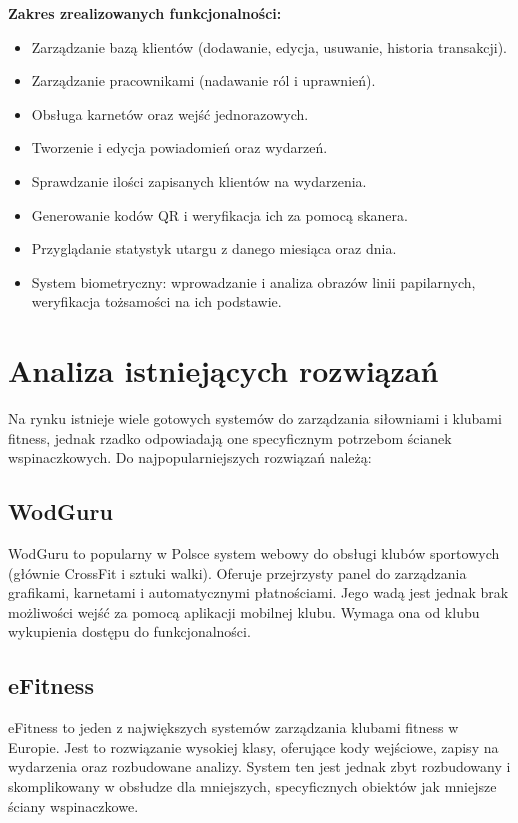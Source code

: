 \textbf{Zakres zrealizowanych funkcjonalności:}
\begin{itemize}
    \item Zarządzanie bazą klientów (dodawanie, edycja, usuwanie, historia transakcji).
    \item Zarządzanie pracownikami (nadawanie ról i uprawnień).
    \item Obsługa karnetów oraz wejść jednorazowych.
    \item Tworzenie i edycja powiadomień oraz wydarzeń.
    \item Sprawdzanie ilości zapisanych klientów na wydarzenia.
    \item Generowanie kodów QR i weryfikacja ich za pomocą skanera.
    \item Przyglądanie statystyk utargu z danego miesiąca oraz dnia.
    \item System biometryczny: wprowadzanie i analiza obrazów linii papilarnych, weryfikacja tożsamości na ich podstawie.
\end{itemize}

\section{Analiza istniejących rozwiązań}
\label{sec:istniejaceRozwiazania}

Na rynku istnieje wiele gotowych systemów do zarządzania siłowniami i klubami fitness, jednak rzadko odpowiadają one specyficznym potrzebom ścianek wspinaczkowych. Do najpopularniejszych rozwiązań należą:

\subsection{WodGuru}\cite{WodGuru}
WodGuru to popularny w Polsce system webowy do obsługi klubów sportowych (głównie CrossFit i sztuki walki). Oferuje przejrzysty panel do zarządzania grafikami, karnetami i automatycznymi płatnościami. Jego wadą jest jednak brak możliwości wejść za pomocą aplikacji mobilnej klubu. Wymaga ona od klubu wykupienia dostępu do funkcjonalności.

\subsection{eFitness}\cite{eFitness}
eFitness to jeden z największych systemów zarządzania klubami fitness w Europie. Jest to rozwiązanie wysokiej klasy, oferujące kody wejściowe, zapisy na wydarzenia oraz rozbudowane analizy. System ten jest jednak zbyt rozbudowany i skomplikowany w obsłudze dla mniejszych, specyficznych obiektów jak mniejsze ściany wspinaczkowe.

